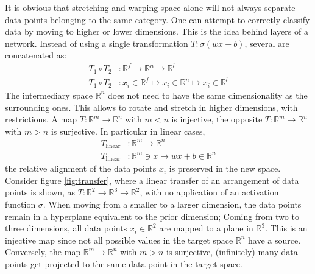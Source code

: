 \documentclass[a4paper, justified]{tufte-handout}
\begin{document}
It is obvious that stretching and warping space alone will not  always separate data points belonging to the same category. One can attempt to correctly classify data by moving to higher or lower dimensions. This is the idea behind layers of a network. Instead of using a single transformation $T:\sigma(wx+b)$, several are concatenated as:
\begin{align}
T_1\circ T_2&: \mathbb{R}^f \to \mathbb{R}^n \to \mathbb{R}^l\nonumber\\
T_1\circ T_2&: x_i \in \mathbb{R}^f \mapsto x_i \in \mathbb{R}^n  \mapsto x_i \in \mathbb{R}^l
\end{align}
The intermediary space $\mathbb{R}^n$ does not need to have the same dimensionality as the surrounding ones. This allows to rotate and stretch in higher dimensions, with restrictions. A map $T: \mathbb{R}^m \to \mathbb{R}^n$ with $m<n$ is injective, the opposite $T:\mathbb{R}^m \to \mathbb{R}^n$ with $m>n$ is surjective. In particular in linear cases,
\begin{align}
T_\text{linear} &:\mathbb{R}^m \to \mathbb{R}^n\nonumber\\
T_\text{linear} &: \mathbb{R}^m \ni x \mapsto wx+b \in \mathbb{R}^n
\end{align}
the relative alignment of the data points $x_i$ is preserved in the new space. Consider figure \ref{fig:transfer}, where a linear transfer of an arrangement of data points is shown, as $T:\mathbb{R}^2\to \mathbb{R}^3\to \mathbb{R}^2$, with no application of an activation function $\sigma$. When moving from a smaller to a larger dimension, the data points remain in a hyperplane equivalent to the prior dimension; Coming from two to three dimensions, all data points $x_i \in \mathbb{R}^2$ are mapped to a plane in $\mathbb{R}^3$. This is an injective map since not all possible values in the target space $\mathbb{R}^n$ have a source. Conversely, the map $\mathbb{R}^m\to \mathbb{R}^n$ with $m>n$ is surjective, (infinitely) many data points get projected to the same data point in the target space.
\end{document}

